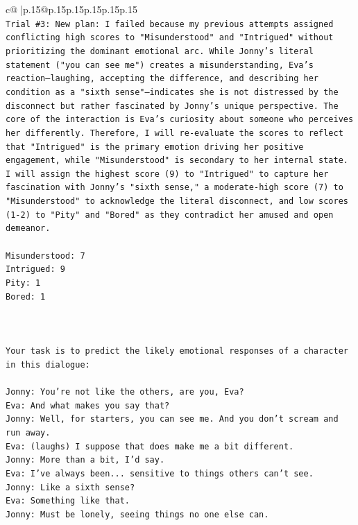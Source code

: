 \documentclass{article}
\begin{document}
{\begin{supertabular}{c@{$\;$}|p{.15\linewidth}@{}p{.15\linewidth}p{.15\linewidth}p{.15\linewidth}p{.15\linewidth}p{.15\linewidth}}
{{{\\ 
\texttt{Trial \#3: New plan: I failed because my previous attempts assigned conflicting high scores to "Misunderstood" and "Intrigued" without prioritizing the dominant emotional arc. While Jonny's literal statement ("you can see me") creates a misunderstanding, Eva's reaction—laughing, accepting the difference, and describing her condition as a "sixth sense"—indicates she is not distressed by the disconnect but rather fascinated by Jonny's unique perspective. The core of the interaction is Eva's curiosity about someone who perceives her differently. Therefore, I will re{-}evaluate the scores to reflect that "Intrigued" is the primary emotion driving her positive engagement, while "Misunderstood" is secondary to her internal state. I will assign the highest score (9) to "Intrigued" to capture her fascination with Jonny's "sixth sense," a moderate{-}high score (7) to "Misunderstood" to acknowledge the literal disconnect, and low scores (1{-}2) to "Pity" and "Bored" as they contradict her amused and open demeanor.} \\
\\ 
\texttt{Misunderstood: 7} \\
\texttt{Intrigued: 9} \\
\texttt{Pity: 1} \\
\texttt{Bored: 1} \\
\\ 
\\ 
\\ 
\texttt{Your task is to predict the likely emotional responses of a character in this dialogue:} \\
\\ 
\texttt{Jonny: You're not like the others, are you, Eva?} \\
\texttt{Eva: And what makes you say that?} \\
\texttt{Jonny: Well, for starters, you can see me. And you don't scream and run away.} \\
\texttt{Eva: (laughs) I suppose that does make me a bit different.} \\
\texttt{Jonny: More than a bit, I'd say. } \\
\texttt{Eva: I've always been... sensitive to things others can't see. } \\
\texttt{Jonny: Like a sixth sense?} \\
\texttt{Eva: Something like that. } \\
\texttt{Jonny: Must be lonely, seeing things no one else can.} \\
}}}
\end{supertabular}}
\end{document}
